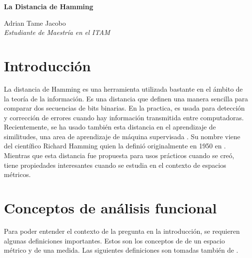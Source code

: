 \documentclass[spanish,twoside]{book}
\begin{document}
	\setcounter{page}{1} %
	\fancyhead{}
	\renewcommand{\headrulewidth}{2pt}%
	\renewcommand{\headrule}{\hbox to\headwidth{%
			\color{NavyBlue}\leaders\hrule height \headrulewidth\hfill}}%
	\fancyfoot{}
	\fancyfoot[LE,RO]{\thepage}
	\parindent=0in
	\hspace{1pt}
	\textbf{\Large La Distancia de Hamming}
	\begin{flushright}
		
		Adrian Tame Jacobo \\
		\textit{Estudiante de Maestría en el ITAM}
		
	\end{flushright}
	
	
	\section*{Introducción} 
	\qquad La distancia de Hamming es una herramienta utilizada bastante en el ámbito de la teoría de la información. Es una distancia que definen una manera sencilla para comparar dos secuencias de bits binarias. En la practica, es usada para detección y corrección de errores cuando hay información transmitida entre computadoras. Recientemente, se ha usado también esta distancia en el aprendizaje de similitudes, una area de aprendizaje de máquina supervisada \cite{norouzi2012hamming}. Su nombre viene del científico Richard Hamming quien la definió originalmente en 1950 en  \cite{hamming1950error}. Mientras que esta distancia fue propuesta para usos prácticos cuando se creó, tiene propiedades interesantes cuando se estudia en el contexto de espacios métricos. 
	
	\section*{Conceptos de análisis funcional}
	Para poder entender el contexto de la pregunta en la introducción, se requieren algunas definiciones importantes. Estos son los conceptos de de un espacio métrico y de una medida. Las siguientes definiciones son tomadas también de \cite{kreyszig1978introductory}. 
	
\end{document}
